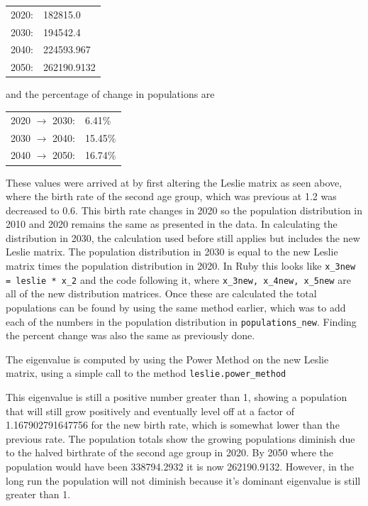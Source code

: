 \documentclass[letterpaper,12pt]{article}
\begin{document}
\vspace{11pt}

\begin{tabular}{l l}
2020: & 182815.0 \\
2030: & 194542.4 \\
2040: & 224593.967 \\
2050: & 262190.9132
\end{tabular}

\vspace{11pt}

and the percentage of change in populations are

\vspace{11pt}

\begin{tabular}{l l}
2020 $\to$ 2030: & 6.41\% \\
2030 $\to$ 2040: & 15.45\% \\
2040 $\to$ 2050: & 16.74\%
\end{tabular}

\vspace{11pt}

These values were arrived at by first altering the Leslie matrix as seen above, where
the birth rate of the second age group, which was previous at 1.2 was decreased to 0.6.
This birth rate changes in 2020 so the population distribution in 2010 and 2020 remains the same as
presented in the data.
In calculating the distribution in 2030, the calculation used before still applies but includes the
new Leslie matrix.
The population distribution in 2030 is equal to the new Leslie matrix times the population
distribution in 2020.
In Ruby this looks like \texttt{x\_3new = leslie * x\_2} and the code following it,
where \texttt{x\_3new, x\_4new, x\_5new} are all of the new distribution matrices.
Once these are calculated the total populations can be found by using the same method earlier,
which was to add each of the numbers in the population distribution in \texttt{populations\_new}.
Finding the percent change was also the same as previously done. 

The eigenvalue is computed by using the Power Method on the new Leslie matrix, using a simple call to the method \texttt{leslie.power\_method}

This eigenvalue is still a positive number greater than 1, showing a population that will still grow positively and eventually
level off at a factor of 1.167902791647756 for the new birth rate, which is somewhat lower than the previous rate.
The population totals show the growing populations diminish due to the halved birthrate of the second age group in 2020. By
2050 where the population would have been 338794.2932 it is now 262190.9132.
However, in the long run the population will not diminish because it's dominant eigenvalue is still greater than 1.
\end{document}
